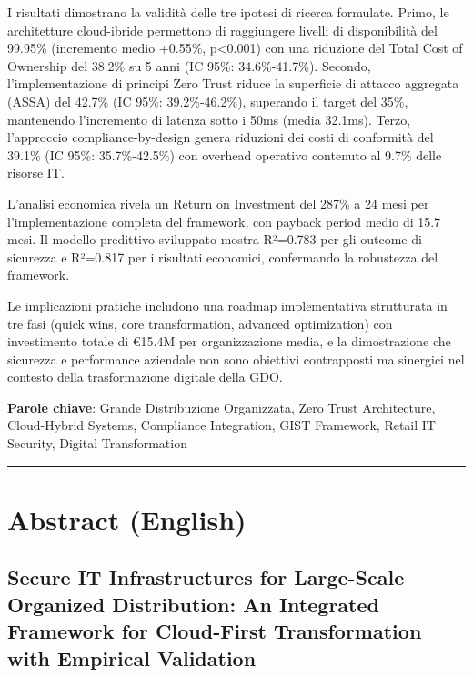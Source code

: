 \documentclass[12pt,a4paper,oneside]{book}
\numberwithin{figure}{chapter} %
\numberwithin{table}{chapter}  %
\begin{document}
I risultati dimostrano la validità delle tre ipotesi di ricerca
formulate. Primo, le architetture cloud-ibride permettono di raggiungere
livelli di disponibilità del 99.95\% (incremento medio +0.55\%,
p\textless0.001) con una riduzione del Total Cost of Ownership del
38.2\% su 5 anni (IC 95\%: 34.6\%-41.7\%). Secondo, l'implementazione di
principi Zero Trust riduce la superficie di attacco aggregata (ASSA) del
42.7\% (IC 95\%: 39.2\%-46.2\%), superando il target del 35\%,
mantenendo l'incremento di latenza sotto i 50ms (media 32.1ms). Terzo,
l'approccio compliance-by-design genera riduzioni dei costi di
conformità del 39.1\% (IC 95\%: 35.7\%-42.5\%) con overhead operativo
contenuto al 9.7\% delle risorse IT.

L'analisi economica rivela un Return on Investment del 287\% a 24 mesi
per l'implementazione completa del framework, con payback period medio
di 15.7 mesi. Il modello predittivo sviluppato mostra R²=0.783 per gli
outcome di sicurezza e R²=0.817 per i risultati economici, confermando
la robustezza del framework.

Le implicazioni pratiche includono una roadmap implementativa
strutturata in tre fasi (quick wins, core transformation, advanced
optimization) con investimento totale di €15.4M per organizzazione
media, e la dimostrazione che sicurezza e performance aziendale non sono
obiettivi contrapposti ma sinergici nel contesto della trasformazione
digitale della GDO.

\textbf{Parole chiave}: Grande Distribuzione Organizzata, Zero Trust
Architecture, Cloud-Hybrid Systems, Compliance Integration, GIST
Framework, Retail IT Security, Digital Transformation

\begin{center}\rule{0.5\linewidth}{0.5pt}\end{center}

\section{Abstract (English)}\label{abstract-english}

\subsection{Secure IT Infrastructures for Large-Scale Organized
Distribution: An Integrated Framework for Cloud-First Transformation
with Empirical
Validation}\label{secure-it-infrastructures-for-large-scale-organized-distribution-an-integrated-framework-for-cloud-first-transformation-with-empirical-validation}
\end{document}
